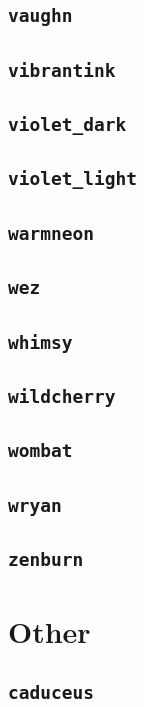 \subsection{\texttt{vaughn}}
\newpage
\subsection{\texttt{vibrantink}}
\newpage
\subsection{\texttt{violet\_dark}}
\newpage
\subsection{\texttt{violet\_light}}
\newpage
\subsection{\texttt{warmneon}}
\newpage
\subsection{\texttt{wez}}
\newpage
\subsection{\texttt{whimsy}}
\newpage
\subsection{\texttt{wildcherry}}
\newpage
\subsection{\texttt{wombat}}
\newpage
\subsection{\texttt{wryan}}
\newpage
\subsection{\texttt{zenburn}}
\newpage

\section{Other}

\subsection{\texttt{caduceus}}
\newpage


